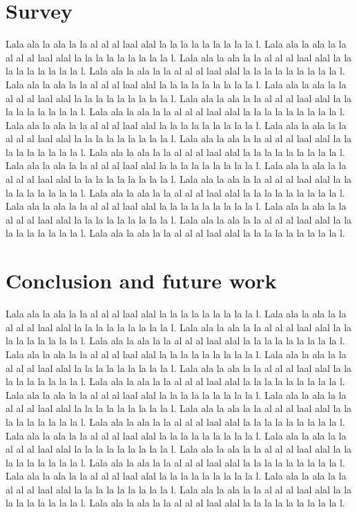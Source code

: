 \documentclass{article}
\begin{document}
\section{Survey}

Lala ala la ala la la al al al laal alal la la la la la la la la la l. Lala ala la ala la la al al al laal alal la la la la la la la la la l. Lala ala la ala la la al al al laal alal la la la la la la la la la l. Lala ala la ala la la al al al laal alal la la la la la la la la la l. Lala ala la ala la la al al al laal alal la la la la la la la la la l. Lala ala la ala la la al al al laal alal la la la la la la la la la l. Lala ala la ala la la al al al laal alal la la la la la la la la la l. Lala ala la ala la la al al al laal alal la la la la la la la la la l. Lala ala la ala la la al al al laal alal la la la la la la la la la l. Lala ala la ala la la al al al laal alal la la la la la la la la la l. Lala ala la ala la la al al al laal alal la la la la la la la la la l. Lala ala la ala la la al al al laal alal la la la la la la la la la l. Lala ala la ala la la al al al laal alal la la la la la la la la la l. Lala ala la ala la la al al al laal alal la la la la la la la la la l. Lala ala la ala la la al al al laal alal la la la la la la la la la l. Lala ala la ala la la al al al laal alal la la la la la la la la la l. Lala ala la ala la la al al al laal alal la la la la la la la la la l. Lala ala la ala la la al al al laal alal la la la la la la la la la l. Lala ala la ala la la al al al laal alal la la la la la la la la la l. Lala ala la ala la la al al al laal alal la la la la la la la la la l. 


\section{Conclusion and future work}

Lala ala la ala la la al al al laal alal la la la la la la la la la l. Lala ala la ala la la al al al laal alal la la la la la la la la la l. Lala ala la ala la la al al al laal alal la la la la la la la la la l. Lala ala la ala la la al al al laal alal la la la la la la la la la l. Lala ala la ala la la al al al laal alal la la la la la la la la la l. Lala ala la ala la la al al al laal alal la la la la la la la la la l. Lala ala la ala la la al al al laal alal la la la la la la la la la l. Lala ala la ala la la al al al laal alal la la la la la la la la la l. Lala ala la ala la la al al al laal alal la la la la la la la la la l. Lala ala la ala la la al al al laal alal la la la la la la la la la l. Lala ala la ala la la al al al laal alal la la la la la la la la la l. Lala ala la ala la la al al al laal alal la la la la la la la la la l. Lala ala la ala la la al al al laal alal la la la la la la la la la l. Lala ala la ala la la al al al laal alal la la la la la la la la la l. Lala ala la ala la la al al al laal alal la la la la la la la la la l. Lala ala la ala la la al al al laal alal la la la la la la la la la l. Lala ala la ala la la al al al laal alal la la la la la la la la la l. Lala ala la ala la la al al al laal alal la la la la la la la la la l. Lala ala la ala la la al al al laal alal la la la la la la la la la l. Lala ala la ala la la al al al laal alal la la la la la la la la la l. 


\printbibliography
\nocite{*}
\end{document}

